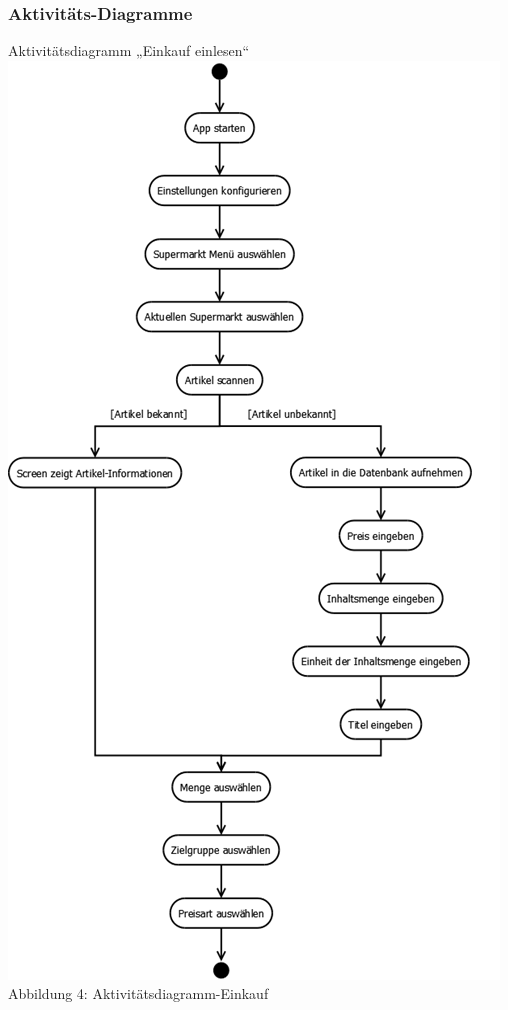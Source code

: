 \documentclass[12pt,a4paper]{article}
\begin{document}
\subsubsection*{Aktivitäts-Diagramme}
Aktivitätsdiagramm „Einkauf einlesen“ 
\\
\includegraphics[scale=0.6, origin=l]{Aktivitaets-Diagramm.png}
\\
\footnotesize Abbildung 4: Aktivitätsdiagramm-Einkauf
\normalsize
\end{document}
